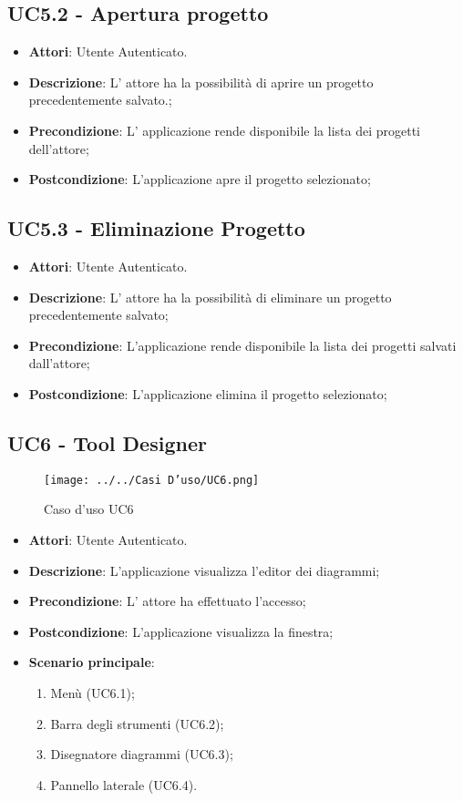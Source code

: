\subsection{UC5.2 - Apertura progetto} 
\label{ssec:UC5.2} 
\begin{itemize} 
\item \textbf{Attori}: Utente Autenticato.
\item \textbf{Descrizione}: L’ attore ha la possibilità di aprire un progetto precedentemente salvato.;
\item \textbf{Precondizione}: L’ applicazione rende disponibile la lista dei progetti dell'attore;
\item \textbf{Postcondizione}: L’applicazione apre il progetto selezionato;
\end{itemize} 
\subsection{UC5.3 - Eliminazione Progetto} 
\label{ssec:UC5.3} 
\begin{itemize} 
\item \textbf{Attori}: Utente Autenticato.
\item \textbf{Descrizione}: L' attore ha la possibilità di eliminare un progetto precedentemente salvato;
\item \textbf{Precondizione}: L’applicazione rende disponibile la lista dei progetti salvati dall'attore;
\item \textbf{Postcondizione}: L’applicazione elimina il progetto selezionato;
\end{itemize} 
\subsection{UC6 - Tool Designer} 
\label{ssec:UC6} 
\begin{figure}[h!] 
\centering 
\texttt{[image: ../../Casi D'uso/UC6.png]} 
\caption{Caso d'uso UC6} 
 \end{figure} 
\begin{itemize} 
\item \textbf{Attori}: Utente Autenticato.
\item \textbf{Descrizione}: L'applicazione visualizza l'editor dei diagrammi;
\item \textbf{Precondizione}: L' attore ha effettuato l'accesso;
\item \textbf{Postcondizione}: L'applicazione visualizza la finestra;
\item \textbf{Scenario principale}: \begin{enumerate}\item Menù (UC6.1);\item Barra degli strumenti (UC6.2);\item Disegnatore diagrammi (UC6.3);\item Pannello laterale (UC6.4). 
 \end{enumerate}
\end{itemize} 
